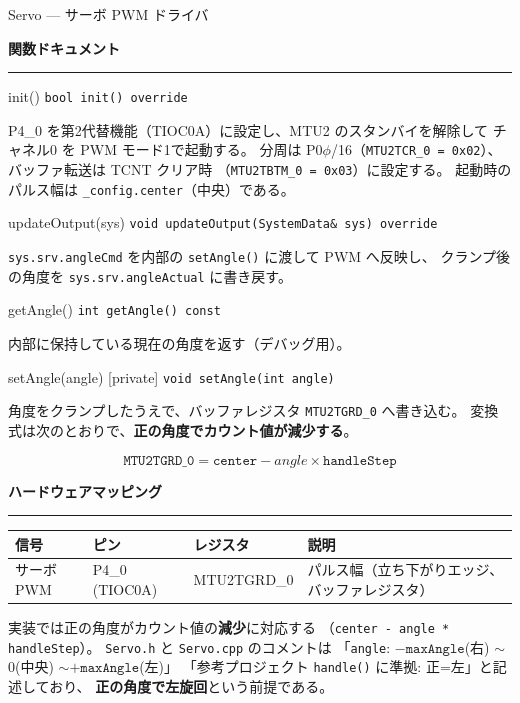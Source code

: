 \documentclass[a4paper,11pt,dvipdfmx]{jsarticle}
\makeatletter
\newcommand{\apisection}[1]{%
  \par\addvspace{4mm}%
  {\normalsize\bfseries\color{headerblue} #1}%
  \par\vspace{-1mm}%
  {\color{accentblue!40}\rule{\linewidth}{0.5pt}}%
  \par\nobreak\vspace{2mm}%
  \@afterheading
}
\makeatother
\begin{document}
\begin{apibox}{Servo --- サーボ PWM ドライバ}
\apisection{関数ドキュメント}

\begin{funcblock}{init()}
\texttt{bool init() override}

\vspace{1.5mm}
P4\_0 を第2代替機能（TIOC0A）に設定し、MTU2 のスタンバイを解除して
チャネル0 を PWM モード1で起動する。
分周は P0$\phi$/16（\texttt{MTU2TCR\_0 = 0x02}）、バッファ転送は TCNT クリア時
（\texttt{MTU2TBTM\_0 = 0x03}）に設定する。
起動時のパルス幅は \texttt{\_config.center}（中央）である。
\end{funcblock}

\begin{funcblock}{updateOutput(sys)}
\texttt{void updateOutput(SystemData\& sys) override}

\vspace{1.5mm}
\texttt{sys.srv.angleCmd} を内部の \texttt{setAngle()} に渡して PWM へ反映し、
クランプ後の角度を \texttt{sys.srv.angleActual} に書き戻す。
\end{funcblock}

\begin{funcblock}{getAngle()}
\texttt{int getAngle() const}

\vspace{1.5mm}
内部に保持している現在の角度を返す（デバッグ用）。
\end{funcblock}

\begin{funcblock}{setAngle(angle) \normalfont\small\color{gray}[private]}
\texttt{void setAngle(int angle)}

\vspace{1.5mm}
角度をクランプしたうえで、バッファレジスタ \texttt{MTU2TGRD\_0} へ書き込む。
変換式は次のとおりで、\textbf{正の角度でカウント値が減少する}。

\[
  \mathtt{MTU2TGRD\_0} = \mathtt{center} - \mathit{angle} \times \mathtt{handleStep}
\]
\end{funcblock}

\apisection{ハードウェアマッピング}

\begin{tabularx}{\textwidth}{l l l X}
\toprule
\textbf{信号} & \textbf{ピン} & \textbf{レジスタ} & \textbf{説明} \\
\midrule
サーボ PWM & P4\_0 (TIOC0A) & MTU2TGRD\_0 & パルス幅（立ち下がりエッジ、バッファレジスタ） \\
\bottomrule
\end{tabularx}

\begin{cautionbox}
実装では正の角度がカウント値の\textbf{減少}に対応する
（\texttt{center - angle * handleStep}）。
\texttt{Servo.h} と \texttt{Servo.cpp} のコメントは
「\texttt{angle}: $-\mathtt{maxAngle}$(右) $\sim$ 0(中央) $\sim +\mathtt{maxAngle}$(左)」
「参考プロジェクト \texttt{handle()} に準拠: 正=左」と記述しており、
\textbf{正の角度で左旋回}という前提である。


\end{cautionbox}
\end{apibox}
\end{document}
